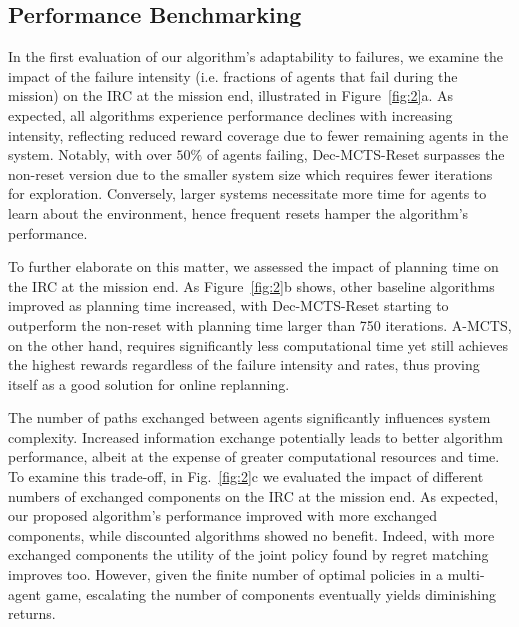 \subsection{Performance Benchmarking}
In the first evaluation of our algorithm's adaptability to failures, we examine the impact of the failure intensity (i.e. fractions of agents that fail during the mission) on the IRC at the mission end, illustrated in Figure~\ref{fig:2}a. As expected, all algorithms experience performance declines with increasing intensity, reflecting reduced reward coverage due to fewer remaining agents in the system. Notably, with over $50\%$ of agents failing, Dec-MCTS-Reset surpasses the non-reset version due to the smaller system size which requires fewer iterations for exploration. Conversely, larger systems necessitate more time for agents to learn about the environment, hence frequent resets hamper the algorithm's performance.

To further elaborate on this matter, we assessed the impact of planning time on the IRC at the mission end. As Figure~\ref{fig:2}b shows, other baseline algorithms improved as planning time increased, with Dec-MCTS-Reset starting to outperform the non-reset with planning time larger than 750 iterations. A-MCTS, on the other hand, requires significantly less computational time yet still achieves the highest rewards regardless of the failure intensity and rates, thus proving itself as a good solution for online replanning.

The number of paths exchanged between agents significantly influences system complexity. Increased information exchange potentially leads to better algorithm performance, albeit at the expense of greater computational resources and time. To examine this trade-off, in Fig.~\ref{fig:2}c we evaluated the impact of different numbers of exchanged components on the IRC at the mission end. As expected, our proposed algorithm's performance improved with more exchanged components, while discounted algorithms showed no benefit. Indeed, with more exchanged components the utility of the joint policy found by regret matching improves too. However, given the finite number of optimal policies in a multi-agent game, escalating the number of components eventually yields diminishing returns.


